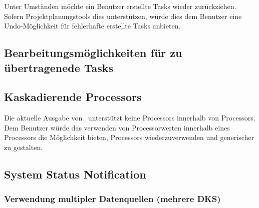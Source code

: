 			Unter Umständen möchte ein Benutzer erstellte Tasks wieder zurückziehen.
			Sofern Projektplanungstools dies unterstützen, würde dies dem Benutzer eine Undo-Möglichkeit für fehlerhafte erstellte Tasks anbieten.
		
		
		\subsection{Bearbeitungsmöglichkeiten für zu übertragenede Tasks}

			
			
			
		\subsection{Kaskadierende Processors}
		
			Die aktuelle Ausgabe von \eeppi\ unterstützt keine Processors innerhalb von Processors.
			Dem Benutzer würde das verwenden von Processorwerten innerhalb eines Processors die Möglichkeit bieten, Processors wiederzuverwenden und generischer zu gestalten.
			
			
		\subsection{System Status Notification}
		
		
		
	
		\subsubsection{Verwendung multipler Datenquellen (mehrere DKS)}